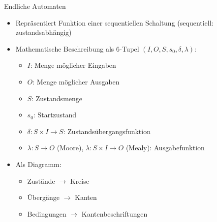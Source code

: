 \documentclass[
  german,            %
  aspectratio=169,    %
]{tumbeamer}
\begin{document}
\begin{frame}[fragile, c]{Endliche Automaten}{}
	\begin{itemize}
		\item Repräsentiert Funktion einer sequentiellen Schaltung (sequentiell: zustandsabhängig)
		\item Mathematische Beschreibung als 6-Tupel $(I, O, S, s_0, \delta, \lambda)$:
		      \begin{itemize}
			      \item $I$: Menge möglicher Eingaben
			      \item $O$: Menge möglicher Ausgaben
			      \item $S$: Zustandsmenge
			      \item $s_0$: Startzustand
			      \item $\delta:  S\times I\rightarrow S$: Zustandsübergangsfunktion
			      \item $\lambda: S\rightarrow O$ (Moore), $\lambda: S\times I\rightarrow O$ (Mealy): Ausgabefunktion
		      \end{itemize}
      \item Als Diagramm:
        \begin{itemize}
          \item Zustände $\rightarrow$ Kreise
          \item Übergänge $\rightarrow$ Kanten
          \item Bedingungen $\rightarrow$ Kantenbeschriftungen
        \end{itemize}
	\end{itemize}
\end{frame}
\end{document}
